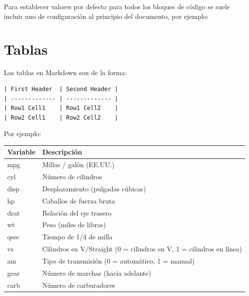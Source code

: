 \documentclass[
]{book}
\newenvironment{Shaded}{\begin{snugshade}}{\end{snugshade}}
\newcommand{\InformationTok}[1]{\textcolor[rgb]{0.56,0.35,0.01}{\textbf{\textit{#1}}}}
\theoremstyle{definition}
\theoremstyle{definition}
\theoremstyle{definition}
\theoremstyle{definition}
\theoremstyle{remark}
\begin{document}
Para establecer valores por defecto para todos los bloques de código
se suele incluir uno de configuración al principio del documento, por ejemplo:

\begin{Shaded}
\end{Shaded}

\hypertarget{tablas}{%
\section{Tablas}\label{tablas}}

Las tablas en Markdown son de la forma:

\begin{verbatim}
| First Header  | Second Header |
| ------------- | ------------- |
| Row1 Cell1    | Row1 Cell2    |
| Row2 Cell1    | Row2 Cell2    |
\end{verbatim}

Por ejemplo:

\begin{longtable}[]{@{}ll@{}}
\toprule
Variable & Descripción \\
\midrule
\endhead
mpg & Millas / galón (EE.UU.) \\
cyl & Número de cilindros \\
disp & Desplazamiento (pulgadas cúbicas) \\
hp & Caballos de fuerza bruta \\
drat & Relación del eje trasero \\
wt & Peso (miles de libras) \\
qsec & Tiempo de 1/4 de milla \\
vs & Cilindros en V/Straight (0 = cilindros en V, 1 = cilindros en línea) \\
am & Tipo de transmisión (0 = automático, 1 = manual) \\
gear & Número de marchas (hacia adelante) \\
carb & Número de carburadores \\
\bottomrule
\end{longtable}
\end{document}
